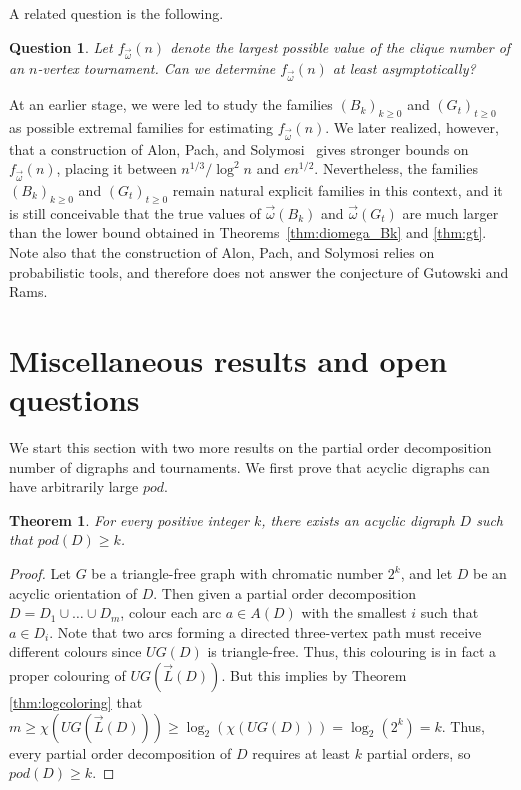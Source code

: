 \documentclass{article}
\newcommand{\diomega}{\vec\omega}
\newcommand{\arrowL}{\overrightarrow{L}}
\newtheorem{question}[lemma]{Question}
\newtheorem{theorem}[lemma]{Theorem}
\begin{document}
A related question is the following. 

\begin{question}
    Let $f_{\diomega}(n)$ denote the largest possible value of the clique number of an $n$-vertex tournament. Can we determine $f_{\diomega}(n)$ at least asymptotically?
\end{question}

At an earlier stage, we were led to study the families $(B_k)_{k\ge 0}$ and $(G_t)_{t \geq 0}$ as possible extremal families for estimating $f_{\diomega}(n)$.  We later realized, however, that a construction of Alon, Pach, and Solymosi~\cite[Theorem~1.3]{AlonPachSolymosi2001}  gives stronger bounds on $f_{\diomega}(n)$, placing it between $n^{1/3}/\log^2 n$ and $e n^{1/2}$. Nevertheless, the families $(B_k)_{k \geq 0}$ and $(G_t)_{t \geq 0}$ remain natural explicit families in this context, and it is still conceivable that the true values of $\diomega(B_k)$ and $\diomega(G_t)$  are much larger than the lower bound obtained in Theorems~\ref{thm:diomega_Bk} and \ref{thm:gt}. Note also that the construction of Alon, Pach, and Solymosi relies on probabilistic tools, and therefore does not answer the conjecture of Gutowski and Rams.


\section{Miscellaneous results and open questions}\label{sec:open_questions}

We start this section with two more results on the partial order decomposition number of digraphs and tournaments. We first prove that acyclic digraphs can have arbitrarily large $pod$. 
\begin{theorem}
    For every positive integer $k$, there exists an acyclic digraph $D$ such that $pod(D) \geq k$.
\end{theorem}

\begin{proof}
    Let $G$ be a triangle-free graph with chromatic number $2^k$, and let $D$ be an acyclic orientation of $D$. Then given a partial order decomposition $D = D_1 \cup \dots \cup D_m$, colour each arc $a \in A(D)$ with the smallest $i$ such that $a \in D_i$. Note that two arcs forming a directed three-vertex path must receive different colours since $UG(D)$ is triangle-free. Thus, this colouring is in fact a proper colouring of $UG(\arrowL(D))$. But this implies by Theorem \ref{thm:logcoloring} that $m \geq \chi(UG(\arrowL(D))) \geq \log_2(\chi(UG(D))) = \log_2(2^k) = k$. Thus, every partial order decomposition of $D$ requires at least $k$ partial orders, so $pod(D) \geq k$.
\end{proof}
\end{document}
